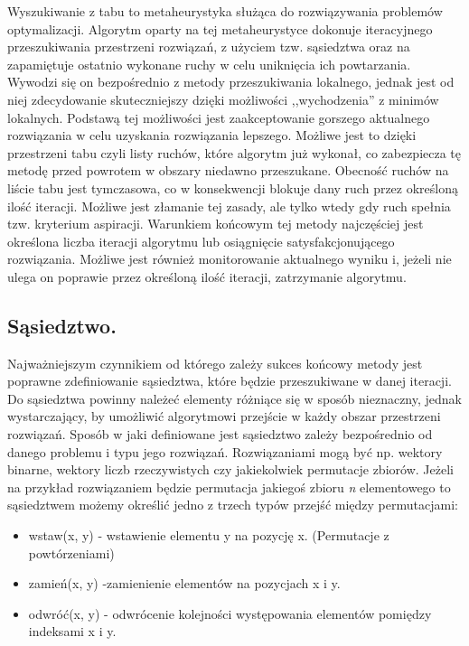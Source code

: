 Wyszukiwanie z tabu to metaheurystyka służąca do rozwiązywania problemów optymalizacji. Algorytm oparty na tej metaheurystyce dokonuje iteracyjnego przeszukiwania przestrzeni rozwiązań, z użyciem tzw. sąsiedztwa oraz na zapamiętuje ostatnio wykonane ruchy w celu uniknięcia ich powtarzania. Wywodzi się on bezpośrednio z metody przeszukiwania lokalnego, jednak jest od niej zdecydowanie skuteczniejszy dzięki możliwości ,,wychodzenia'' z minimów lokalnych. Podstawą tej możliwości jest zaakceptowanie gorszego aktualnego rozwiązania w celu uzyskania rozwiązania lepszego. Możliwe jest to dzięki przestrzeni tabu czyli listy ruchów, które algorytm już wykonał, co zabezpiecza tę metodę przed powrotem w obszary niedawno przeszukane. Obecność ruchów na liście tabu jest tymczasowa, co w konsekwencji blokuje dany ruch przez określoną ilość iteracji. Możliwe jest złamanie tej zasady, ale tylko wtedy gdy ruch spełnia tzw. kryterium aspiracji. Warunkiem końcowym tej metody najczęściej jest określona liczba iteracji algorytmu lub osiągnięcie satysfakcjonującego rozwiązania. Możliwe jest również monitorowanie aktualnego wyniku i, jeżeli nie ulega on poprawie przez określoną ilość iteracji, zatrzymanie algorytmu.

\subsection{Sąsiedztwo.}

Najważniejszym czynnikiem od którego zależy sukces końcowy metody jest poprawne zdefiniowanie sąsiedztwa, które będzie przeszukiwane w danej iteracji. Do sąsiedztwa powinny należeć elementy różniące się w sposób nieznaczny, jednak wystarczający, by umożliwić algorytmowi przejście w każdy obszar przestrzeni rozwiązań. Sposób w jaki definiowane jest sąsiedztwo zależy bezpośrednio od danego problemu i typu jego rozwiązań. Rozwiązaniami mogą być np. wektory binarne, wektory liczb rzeczywistych czy jakiekolwiek permutacje zbiorów. Jeżeli na przykład rozwiązaniem będzie permutacja jakiegoś zbioru \textit{n} elementowego to sąsiedztwem możemy określić jedno z trzech typów przejść między permutacjami:

\begin{itemize}
	\item wstaw(x, y) - wstawienie elementu y na pozycję x. (Permutacje z powtórzeniami)
	\item zamień(x, y) -zamienienie elementów na pozycjach x i y.
	\item odwróć(x, y) - odwrócenie kolejności występowania elementów pomiędzy indeksami x i y.
\end{itemize}


